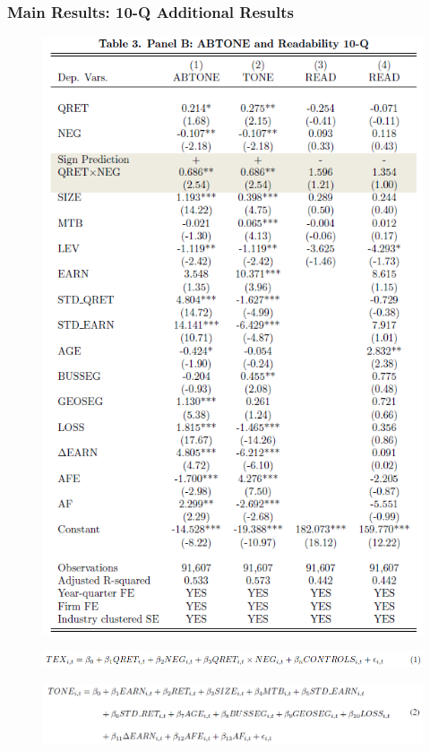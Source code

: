 \documentclass{beamer}
\begin{document}
\begin{frame}
\frametitle{Main Results: 10-Q Additional Results}
\begin{multicols}{2}
	\begin{figure}[h]
	\centering
	\includegraphics[width=0.79\linewidth]{tab3panB}
	\label{tab3panB}
	\end{figure}

	\begin{figure}[h]
	\centering
	\includegraphics[width=1.05\linewidth]{tab3panBeq}
	\label{tab3panBeq}
	\end{figure}

	\begin{figure}[h]
	\centering
	\includegraphics[width=1.05\linewidth]{eq2}
	\label{eq2}
	\end{figure}


\end{multicols}
\end{frame}
\end{document}
